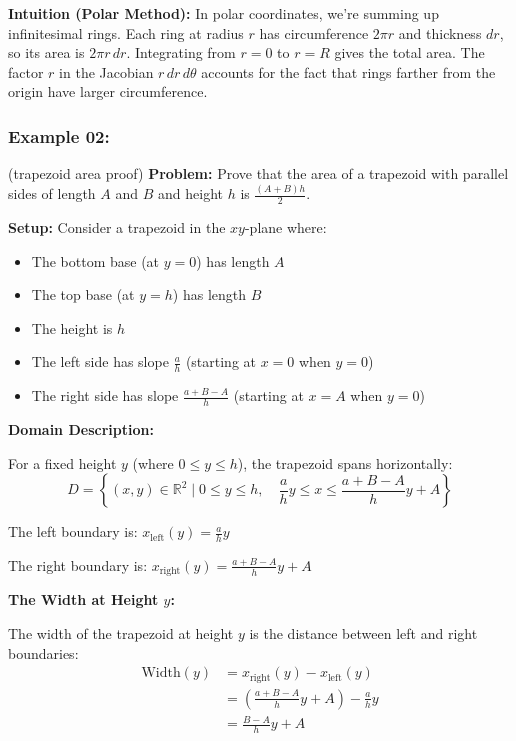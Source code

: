  
\textbf{Intuition (Polar Method):} In polar coordinates, we're summing up infinitesimal rings. Each ring at radius $r$ has circumference $2\pi r$ and thickness $dr$, so its area is $2\pi r \, dr$. Integrating from $r=0$ to $r=R$ gives the total area. The factor $r$ in the Jacobian $r \, dr \, d\theta$ accounts for the fact that rings farther from the origin have larger circumference.
 
\subsubsection{Example 02:}
(trapezoid area proof)
\textbf{Problem:} Prove that the area of a trapezoid with parallel sides of length $A$ and $B$ and height $h$ is $\frac{(A+B)h}{2}$.
 
\textbf{Setup:} Consider a trapezoid in the $xy$-plane where:
\begin{itemize}
  \item The bottom base (at $y=0$) has length $A$
  \item The top base (at $y=h$) has length $B$
  \item The height is $h$
  \item The left side has slope $\frac{a}{h}$ (starting at $x = 0$ when $y = 0$)
  \item The right side has slope $\frac{a+B-A}{h}$ (starting at $x = A$ when $y = 0$)
\end{itemize}
 
\textbf{Domain Description:}
 
For a fixed height $y$ (where $0 \leq y \leq h$), the trapezoid spans horizontally:
\[
D = \left\{ (x,y) \in \mathbb{R}^2 \mid 0 \leq y \leq h, \quad \frac{a}{h}y \leq x \leq \frac{a+B-A}{h}y + A \right\}
\]
 
The left boundary is: $x_{\text{left}}(y) = \frac{a}{h}y$
 
The right boundary is: $x_{\text{right}}(y) = \frac{a+B-A}{h}y + A$
 
\textbf{The Width at Height $y$:}
 
The width of the trapezoid at height $y$ is the distance between left and right boundaries:
\begin{align*}
\text{Width}(y) &= x_{\text{right}}(y) - x_{\text{left}}(y) \\
&= \left(\frac{a+B-A}{h}y + A\right) - \frac{a}{h}y \\
&= \frac{B-A}{h}y + A
\end{align*}
 
